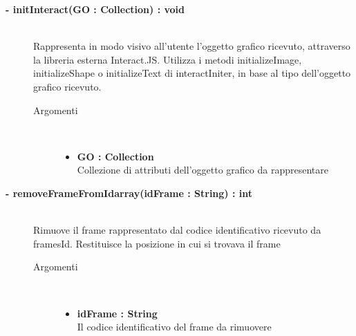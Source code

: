 \begin{description}
	
	\begin{description}
		\item[\textbf{\color{blue}- initInteract(GO : Collection) : void			}] \hfill \\
			Rappresenta in modo visivo all'utente l'oggetto grafico ricevuto, attraverso la libreria esterna Interact.JS. Utilizza i metodi initializeImage, initializeShape o initializeText di interactIniter, in base al tipo dell'oggetto grafico ricevuto.
			
		\begin{description}
			\item[Argomenti] \hfill \\
				\begin{itemize}
				
					\item \textbf{GO : Collection		} \hfill \\
					Collezione di attributi dell'oggetto grafico da rappresentare
					
				\end{itemize}
		\end{description}
	\end{description}
	
	\begin{description}
		\item[\textbf{\color{blue}- removeFrameFromIdarray(idFrame : String) : int			}] \hfill \\
			Rimuove il frame rappresentato dal codice identificativo ricevuto da framesId. Restituisce la posizione in cui si trovava il frame
			
		\begin{description}
			\item[Argomenti] \hfill \\
				\begin{itemize}
				
					\item \textbf{idFrame : String		} \hfill \\
					Il codice identificativo del frame da rimuovere
					
				\end{itemize}
				
		\end{description}
	\end{description}
	

\end{description}
